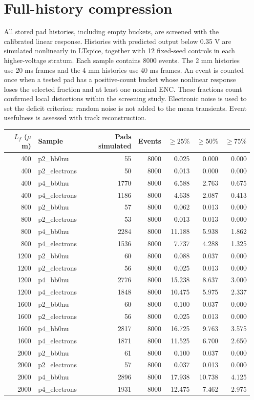 \documentclass[10pt,a4paper]{article}
\begin{document}
\section{Full-history compression}
All stored pad histories, including empty buckets, are screened with the
calibrated linear response. Histories with predicted output below 0.35 V are
simulated nonlinearly in LTspice, together with 12 fixed-seed controls in each
higher-voltage stratum. Each sample contains 8000 events. The 2 mm histories
use 20 ms frames and the 4 mm histories use 40 ms frames.
An event is counted once when a tested pad has a positive-count bucket whose
nonlinear response loses the selected fraction and at least one nominal ENC.
These fractions count confirmed local distortions within the screening study.
Electronic noise is used to set the deficit criterion; random noise is not
added to the mean transients. Event usefulness is assessed with track reconstruction.
\begin{center}\scriptsize
\begin{longtable}{rlrrrrr}\toprule
$L_f$ ($\mu$m) & Sample & Pads simulated & Events & $\geq25\%$ & $\geq50\%$ & $\geq75\%$\\\midrule
400 & p2\_bb0nu & 55 & 8000 & 0.025 & 0.000 & 0.000 \\
400 & p2\_electrons & 50 & 8000 & 0.013 & 0.000 & 0.000 \\
400 & p4\_bb0nu & 1770 & 8000 & 6.588 & 2.763 & 0.675 \\
400 & p4\_electrons & 1186 & 8000 & 4.638 & 2.087 & 0.413 \\
800 & p2\_bb0nu & 57 & 8000 & 0.062 & 0.013 & 0.000 \\
800 & p2\_electrons & 53 & 8000 & 0.013 & 0.013 & 0.000 \\
800 & p4\_bb0nu & 2284 & 8000 & 11.188 & 5.938 & 1.862 \\
800 & p4\_electrons & 1536 & 8000 & 7.737 & 4.288 & 1.325 \\
1200 & p2\_bb0nu & 60 & 8000 & 0.088 & 0.037 & 0.000 \\
1200 & p2\_electrons & 56 & 8000 & 0.025 & 0.013 & 0.000 \\
1200 & p4\_bb0nu & 2776 & 8000 & 15.238 & 8.637 & 3.000 \\
1200 & p4\_electrons & 1848 & 8000 & 10.475 & 5.975 & 2.337 \\
1600 & p2\_bb0nu & 60 & 8000 & 0.100 & 0.037 & 0.000 \\
1600 & p2\_electrons & 56 & 8000 & 0.025 & 0.013 & 0.000 \\
1600 & p4\_bb0nu & 2817 & 8000 & 16.725 & 9.763 & 3.575 \\
1600 & p4\_electrons & 1871 & 8000 & 11.525 & 6.700 & 2.650 \\
2000 & p2\_bb0nu & 61 & 8000 & 0.100 & 0.037 & 0.000 \\
2000 & p2\_electrons & 57 & 8000 & 0.037 & 0.013 & 0.000 \\
2000 & p4\_bb0nu & 2896 & 8000 & 17.938 & 10.738 & 4.125 \\
2000 & p4\_electrons & 1931 & 8000 & 12.475 & 7.462 & 2.975 \\
\bottomrule\end{longtable}\end{center}
\end{document}

